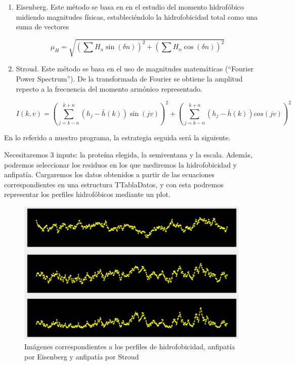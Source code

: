 \documentclass[12pt]{article}
\begin{document}
\begin{enumerate}
\item Eisenberg. Este método se basa en en el estudio del momento hidrofóbico midiendo magnitudes físicas, estableciéndolo la hidrofobicidad total como una suma de vectores 

\begin{equation}
\mu_H =\sqrt{(\sum H_n\sin(\delta n))^2 +(\sum H_n \cos(\delta n))^2}
\end{equation}

\item Stroud. Este método se basa en el uso de magnitudes matemáticas (``Fourier Power Spectrum''). De la transformada de Fourier se obtiene la amplitud repecto a la frecuencia del  momento armónico representado. 

\begin{equation}
I(k, v) =(\sum_{j=k-n}^{k+n} (h_j- \bar{h}(k))\sin(jv))^2 + (\sum_{j=k-n}^{k+n} (h_j- \bar{h}(k))cos(jv))^2
\end{equation}

\end{enumerate}

En lo referido a nuestro programa, la estrategia seguida será la siguiente.
\newline

Necesitaremos 3 inputs: la proteína elegida, la semiventana y la escala. Además, podremos seleccionar los residuos en los que mediremos la hidrofobicidad y anfipatía. Cargaremos los datos obtenidos a partir de las ecuaciones correspondientes en una estructura TTablaDatos, y con esta podremos representar los perfiles hidrofóbicos mediante un plot.

\begin{figure}[H]
\centering
\includegraphics[scale=0.6]{Screenshot_46}
\caption{Imágenes correspondientes a los perfiles de hidrofobicidad, anfipatía por Eisenberg y anfipatía por Stroud}
\end{figure}
\end{document}
